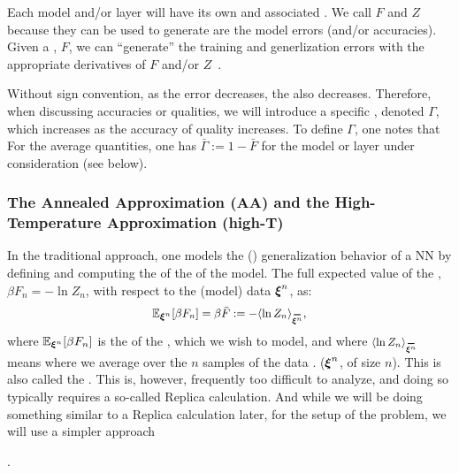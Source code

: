 Each model and/or layer will have its own \PartitionFunction and associated \GeneratingFunctions.
We call $F$ and $Z$ \emph{\GeneratingFunctions} because they can be used to generate are the model errors (and/or accuracies). 
Given a \FreeEnergy, $F$, we can ``generate'' the training and generlization errors with the appropriate derivatives of $F$ and/or $Z$~\cite{LTS90, Solla2023}.

Without sign convention,  as the error decreases, the \FreeEnergy also decreases.
Therefore, when discussing accuracies or qualities,
we will introduce a specific \GeneratingFunction, denoted $\Gamma$, which increases
as the accuracy of quality increases.  To define $\Gamma$, one notes that
For the average quantities, one has
 $\bar{\Gamma}:=1-\bar{F}$ for the model or layer under consideration (see below).


\subsubsection{The Annealed Approximation (AA) and the High-Temperature Approximation (high-T)}
\label{sxn:mathP_annealed}

In the traditional \SMOG approach, one models the (\Typical) generalization behavior of a NN
by defining and computing the \ExpectedValue of the \FreeEnergy of the model.
The full expected value  of the \FreeEnergy, $\beta F_{n}=-\ln Z_{n}$, with respect to the (model)
  data $\boldsymbol{\xi}^{n}$, as:
\begin{align}
  \mathbb{E}_{\NDXIn}[\beta F_n]=\beta\bar{F}:=-\langle \ln Z_{n}\rangle_{\AVGNDXIn},
\end{align}
where $\mathbb{E}_{\boldsymbol{\xi}^{n}}[\beta F_n]$ is the \ExpectedValue of the \FreeEnergy, which we wish to model, and 
where $\langle \ln Z_{n}\rangle_{\AVGNDXIn}$ means where we average over  the $n$ samples of the data .
($\boldsymbol{\xi}^{n}$, of size $n$).  This is also called the \Quenched \FreeEnergy.
This is, however,  frequently too difficult to analyze, and doing so typically
requires a so-called Replica calculation. And while we will be doing something similar
to a Replica calculation later, for the setup of the problem, we will use a simpler approach

.

